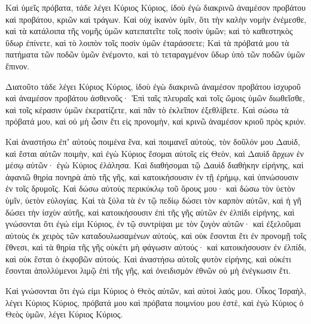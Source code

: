 {\par }{\PP {}Καὶ ὑμεῖς πρόβατα, τάδε λέγει Κύριος Κύριος, ἰδοὺ ἐγὼ διακρινῶ ἀναμέσον προβάτου καὶ προβάτου, κριῶν καὶ τράγων.
Καὶ οὐχ ἱκανὸν ὑμῖν, ὅτι τὴν καλὴν νομὴν ἐνέμεσθε, καὶ τὰ κατάλοιπα τῆς νομῆς ὑμῶν κατεπατεῖτε τοῖς ποσὶν ὑμῶν; καὶ τὸ καθεστηκὸς ὕδωρ ἐπίνετε, καὶ τὸ λοιπὸν τοῖς ποσὶν ὑμῶν ἐταράσσετε;
Καὶ τὰ πρόβατά μου τὰ πατήματα τῶν ποδῶν ὑμῶν ἐνέμοντο, καὶ τὸ τεταραγμένον ὕδωρ ὑπὸ τῶν ποδῶν ὑμῶν ἔπινον.
\par }{\PP {}Διατοῦτο τάδε λέγει Κύριος Κύριος, ἰδοὺ ἐγὼ διακρινῶ ἀναμέσον προβάτου ἰσχυροῦ καὶ ἀναμέσον προβάτου ἀσθενοῦς·
Ἐπὶ ταῖς πλευραῖς καὶ τοῖς ὤμοις ὑμῶν διωθεῖσθε, καὶ τοῖς κέρασιν ὑμῶν ἐκερατίζετε, καὶ πᾶν τὸ ἐκλεῖπον ἐξεθλίβετε.
Καὶ σώσω τὰ πρόβατά μου, καὶ οὐ μὴ ὦσιν ἔτι εἰς προνομὴν, καὶ κρινῶ ἀναμέσον κριοῦ πρὸς κριόν.
\par }{\PP {}Καὶ ἀναστήσω ἐπʼ αὐτοὺς ποιμένα ἕνα, καὶ ποιμανεῖ αὐτοὺς, τὸν δοῦλόν μου Δαυὶδ, καὶ ἔσται αὐτῶν ποιμὴν,
καὶ ἐγὼ Κύριος ἔσομαι αὐτοῖς εἰς Θεὸν, καὶ Δαυὶδ ἄρχων ἐν μέσῳ αὐτῶν· ἐγὼ Κύριος ἐλάλησα.
Καὶ διαθήσομαι τῷ Δαυὶδ διαθήκην εἰρήνης, καὶ ἀφανιῶ θηρία πονηρὰ ἀπὸ τῆς γῆς, καὶ κατοικήσουσιν ἐν τῇ ἐρήμῳ, καὶ ὑπνώσουσιν ἐν τοῖς δρυμοῖς.
Καὶ δώσω αὐτοὺς περικύκλῳ τοῦ ὄρους μου· καὶ δώσω τὸν ὑετὸν ὑμῖν, ὑετὸν εὐλογίας.
Καὶ τὰ ξύλα τὰ ἐν τῷ πεδίῳ δώσει τὸν καρπὸν αὐτῶν, καὶ ἡ γῆ δώσει τὴν ἰσχὺν αὐτῆς, καὶ κατοικήσουσιν ἐπὶ τῆς γῆς αὐτῶν ἐν ἐλπίδι εἰρήνης, καὶ γνώσονται ὅτι ἐγώ εἰμι Κύριος, ἐν τῷ συντρίψαι με τὸν ζυγὸν αὐτῶν· καὶ ἐξελοῦμαι αὐτοὺς ἐκ χειρὸς τῶν καταδουλωσαμένων αὐτοὺς,
καὶ οὐκ ἔσονται ἔτι ἐν προνομῇ τοῖς ἔθνεσι, καὶ τὰ θηρία τῆς γῆς οὐκέτι μὴ φάγωσιν αὐτούς· καὶ κατοικήσουσιν ἐν ἐλπίδι, καὶ οὐκ ἔσται ὁ ἐκφοβῶν αὐτούς.
Καὶ ἀναστήσω αὐτοῖς φυτὸν εἰρήνης, καὶ οὐκέτι ἔσονται ἀπολλύμενοι λιμῷ ἐπὶ τῆς γῆς, καὶ ὀνειδισμὸν ἐθνῶν οὐ μὴ ἐνέγκωσιν ἔτι.
\par }{\PP {}Καὶ γνώσονται ὅτι ἐγώ εἰμι Κύριος ὁ Θεὸς αὐτῶν, καὶ αὐτοὶ λαός μου. Οἶκος Ἰσραὴλ, λέγει Κύριος Κύριος,
πρόβατά μου καὶ πρόβατα ποιμνίου μου ἐστὲ, καὶ ἐγὼ Κύριος ὁ Θεὸς ὑμῶν, λέγει Κύριος Κύριος.

}
